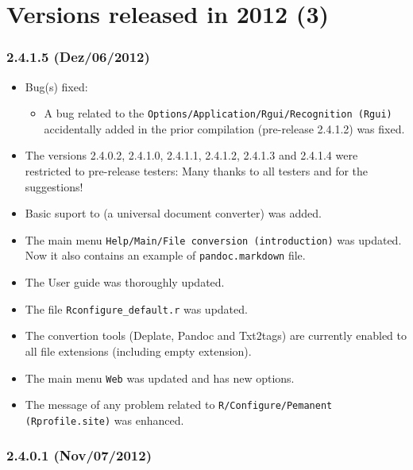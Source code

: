 
\section{Versions released in 2012 (3)}

\subsubsection{2.4.1.5 (Dez/06/2012)}

\begin{itemize}
  \item Bug(s) fixed:
    \begin{itemize}
      \item A bug related to the \texttt{Options/Application/Rgui/Recognition (Rgui)} accidentally added
        in the prior compilation (pre-release 2.4.1.2) was fixed.
    \end{itemize}
  \item The versions 2.4.0.2, 2.4.1.0, 2.4.1.1, 2.4.1.2, 2.4.1.3 and 2.4.1.4 were restricted to pre-release testers:
    Many thanks to all testers and for the suggestions!
  \item Basic suport to  (a universal document converter) was added.
  \item The main menu \texttt{Help/Main/File conversion (introduction)} was updated. Now it also contains an example of \texttt{pandoc.markdown} file.
  \item The User guide was thoroughly updated.
  \item The file \texttt{Rconfigure\_default.r} was updated.
  \item The convertion tools (Deplate, Pandoc and Txt2tags) are currently enabled to all file extensions (including empty extension).
  \item The main menu \texttt{Web} was updated and has new options.
  \item The message of any problem related to \texttt{R/Configure/Pemanent (Rprofile.site)} was enhanced.
\end{itemize}

\subsubsection{2.4.0.1 (Nov/07/2012)}

